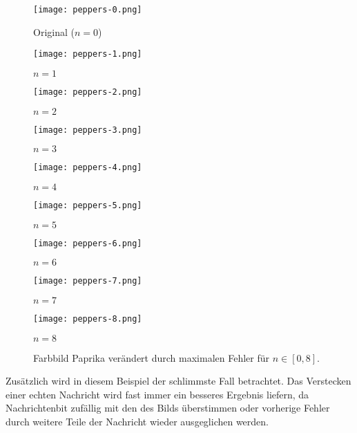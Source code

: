 \begin{figure}[h!]
  \centering
  \begin{minipage}[t]{0.3\textwidth}
    \texttt{[image: peppers-0.png]}
    \caption*{Original ($n = 0$)}
  \end{minipage}
  \hfill
  \begin{minipage}[t]{0.3\textwidth}
    \texttt{[image: peppers-1.png]}
    \caption*{$n = 1$}
  \end{minipage}
  \hfill
  \begin{minipage}[t]{0.3\textwidth}
    \texttt{[image: peppers-2.png]}
    \caption*{$n = 2$}
  \end{minipage}%
  \vspace{0.5cm}
  \begin{minipage}[t]{0.3\textwidth}
    \texttt{[image: peppers-3.png]}
    \caption*{$n = 3$}
  \end{minipage}
  \hfill
  \begin{minipage}[t]{0.3\textwidth}
    \texttt{[image: peppers-4.png]}
    \caption*{$n = 4$}
  \end{minipage}
  \hfill
  \begin{minipage}[t]{0.3\textwidth}
    \texttt{[image: peppers-5.png]}
    \caption*{$n = 5$}
  \end{minipage}%
  \vspace{0.5cm}
  \begin{minipage}[t]{0.3\textwidth}
    \texttt{[image: peppers-6.png]}
    \caption*{$n = 6$}
  \end{minipage}
  \hfill
  \begin{minipage}[t]{0.3\textwidth}
    \texttt{[image: peppers-7.png]}
    \caption*{$n = 7$}
  \end{minipage}
  \hfill
  \begin{minipage}[t]{0.3\textwidth}
    \texttt{[image: peppers-8.png]}
    \caption*{$n = 8$}
  \end{minipage}
  \caption{Farbbild Paprika verändert durch maximalen Fehler für $n \in [0,8]$.}
  \label{fig:peppers}
\end{figure}
\noindent
Zusätzlich wird in diesem Beispiel der schlimmste Fall betrachtet.
Das Verstecken einer echten Nachricht wird fast immer
ein besseres Ergebnis liefern, da Nachrichtenbit
zufällig mit den des Bilds überstimmen oder vorherige Fehler
durch weitere Teile der Nachricht wieder ausgeglichen werden.

